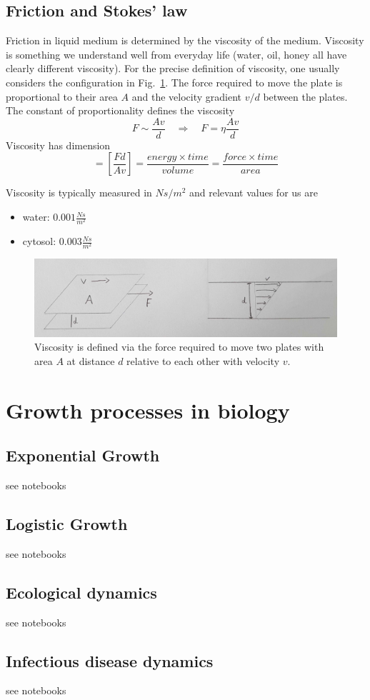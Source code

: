 \subsection{Friction and Stokes' law}
\label{sec:stokeslaw}
Friction in liquid medium is determined by the viscosity of the medium.
Viscosity is something we understand well from everyday life (water, oil, honey all have clearly different viscosity).
For the precise definition of viscosity, one usually considers the configuration in Fig.~\ref{fig:viscosity}.
The force required to move the plate is proportional to their area $A$ and the velocity gradient $v/d$ between the plates.
The constant of proportionality defines the viscosity
\begin{equation}
    F \sim \frac{Av}{d}  \quad \Rightarrow \quad F  = \eta \frac{Av}{d}
\end{equation}
Viscosity has dimension
\begin{equation}
    [\eta] = \left[ \frac{Fd}{Av}\right] = \frac{energy \times time}{volume} = \frac{force \times time}{area}
\end{equation}

Viscosity is typically measured in $N s/m^2$ and relevant values for us are
\begin{itemize}
    \item water: $0.001 \frac{Ns}{m^2}$
    \item cytosol: $0.003 \frac{Ns}{m^2}$
\end{itemize}



\begin{figure}
    \includegraphics[width=\textwidth]{figures/viscosity.png}
    \caption{\label{fig:viscosity}Viscosity is defined via the force required to move two plates with area $A$ at distance $d$ relative to each other with velocity $v$.}
\end{figure}

\section{Growth processes in biology}

\subsection{Exponential Growth}
see notebooks

\subsection{Logistic Growth}
see notebooks

\subsection{Ecological dynamics}
see notebooks

\subsection{Infectious disease dynamics}
see notebooks


